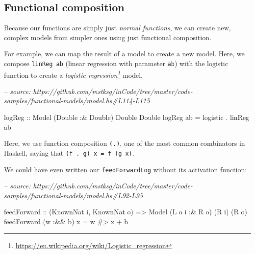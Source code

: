 \documentclass[]{article}
\newenvironment{Shaded}{}{}
\newcommand{\CommentTok}[1]{\textcolor[rgb]{0.38,0.63,0.69}{\textit{#1}}}
\newcommand{\DataTypeTok}[1]{\textcolor[rgb]{0.56,0.13,0.00}{#1}}
\newcommand{\FunctionTok}[1]{\textcolor[rgb]{0.02,0.16,0.49}{#1}}
\newcommand{\NormalTok}[1]{#1}
\newcommand{\OtherTok}[1]{\textcolor[rgb]{0.00,0.44,0.13}{#1}}
\renewcommand{\href}[2]{#2\footnote{\url{#1}}}
\begin{document}
\hypertarget{functional-composition}{%
\subsection{Functional composition}\label{functional-composition}}

Because our functions are simply just \emph{normal functions}, we can create
new, complex models from simpler ones using just functional composition.

For example, we can map the result of a model to create a new model. Here, we
compose \texttt{linReg\ ab} (linear regression with parameter \texttt{ab}) with
the logistic function to create a
\emph{\href{https://en.wikipedia.org/wiki/Logistic_regression}{logistic
regression}} model.

\begin{Shaded}
\begin{Highlighting}[]
\CommentTok{-- source: https://github.com/mstksg/inCode/tree/master/code-samples/functional-models/model.hs#L114-L115}

\OtherTok{logReg ::} \DataTypeTok{Model}\NormalTok{ (}\DataTypeTok{Double} \FunctionTok{:&} \DataTypeTok{Double}\NormalTok{) }\DataTypeTok{Double} \DataTypeTok{Double}
\NormalTok{logReg ab }\FunctionTok{=}\NormalTok{ logistic }\FunctionTok{.}\NormalTok{ linReg ab}
\end{Highlighting}
\end{Shaded}

Here, we use function composition \texttt{(.)}, one of the most common
combinators in Haskell, saying that \texttt{(f\ .\ g)\ x\ =\ f\ (g\ x)}.

We could have even written our \texttt{feedForwardLog} without its activation
function:

\begin{Shaded}
\begin{Highlighting}[]
\CommentTok{-- source: https://github.com/mstksg/inCode/tree/master/code-samples/functional-models/model.hs#L92-L95}

\NormalTok{feedForward}
\OtherTok{    ::}\NormalTok{ (}\DataTypeTok{KnownNat}\NormalTok{ i, }\DataTypeTok{KnownNat}\NormalTok{ o)}
    \OtherTok{=>} \DataTypeTok{Model}\NormalTok{ (}\DataTypeTok{L}\NormalTok{ o i }\FunctionTok{:&} \DataTypeTok{R}\NormalTok{ o) (}\DataTypeTok{R}\NormalTok{ i) (}\DataTypeTok{R}\NormalTok{ o)}
\NormalTok{feedForward (w }\FunctionTok{:&&}\NormalTok{ b) x }\FunctionTok{=}\NormalTok{ w }\FunctionTok{#>}\NormalTok{ x }\FunctionTok{+}\NormalTok{ b}
\end{Highlighting}
\end{Shaded}
\end{document}
